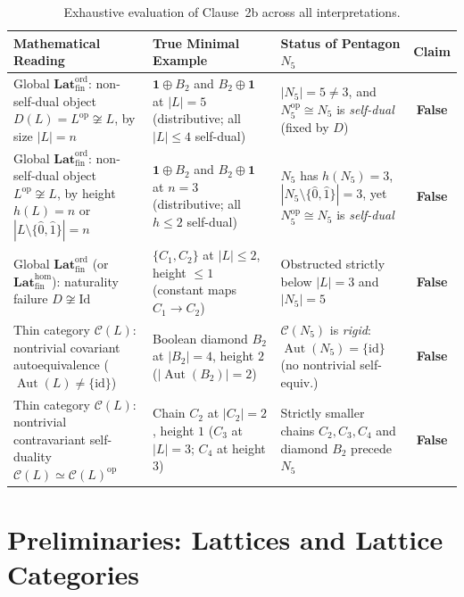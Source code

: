 \documentclass[11pt]{article}
\theoremstyle{definition}
\newcommand{\CatC}{\mathcal{C}}
\newcommand{\FinLatOrd}{\mathbf{Lat}_{\mathrm{fin}}^{\mathrm{ord}}}
\newcommand{\FinLatHom}{\mathbf{Lat}_{\mathrm{fin}}^{\mathrm{hom}}}
\newcommand{\Id}{\mathrm{Id}}
\newcommand{\op}{\mathrm{op}}
\newcommand{\Aut}{\operatorname{Aut}}
\begin{document}
\begin{table}[ht]
\centering
\small
\renewcommand{\arraystretch}{1.22}
\begin{tabular}{@{}>{\raggedright\arraybackslash}p{4.3cm}>{\raggedright\arraybackslash}p{4.4cm}>{\raggedright\arraybackslash}p{4.1cm}c@{}}
\toprule
\textbf{Mathematical Reading} & \textbf{True Minimal Example} & \textbf{Status of Pentagon $N_5$} & \textbf{Claim} \\
\midrule
Global $\FinLatOrd$: non-self-dual object $D(L) = L^{\op} \not\cong L$, by size $|L| = n$ &
$\mathbf{1} \oplus B_2$ and $B_2 \oplus \mathbf{1}$ at $|L| = 5$ (distributive; all $|L| \le 4$ self-dual) &
$|N_5| = 5 \ne 3$, and $N_5^{\op} \cong N_5$ is \emph{self-dual} (fixed by $D$) &
\textbf{False} \\
Global $\FinLatOrd$: non-self-dual object $L^{\op} \not\cong L$, by height $h(L) = n$ or $|L \setminus \{\hat{0},\hat{1}\}| = n$ &
$\mathbf{1} \oplus B_2$ and $B_2 \oplus \mathbf{1}$ at $n = 3$ (distributive; all $h \le 2$ self-dual) &
$N_5$ has $h(N_5) = 3$, $|N_5 \setminus \{\hat{0},\hat{1}\}| = 3$, yet $N_5^{\op} \cong N_5$ is \emph{self-dual} &
\textbf{False} \\
Global $\FinLatOrd$ (or $\FinLatHom$): naturality failure $D \not\cong \Id$ &
$\{C_1, C_2\}$ at $|L| \le 2$, height $\le 1$ (constant maps $C_1 \to C_2$) &
Obstructed strictly below $|L| = 3$ and $|N_5| = 5$ &
\textbf{False} \\
Thin category $\CatC(L)$: nontrivial covariant autoequivalence ($\Aut(L) \ne \{\mathrm{id}\}$) &
Boolean diamond $B_2$ at $|B_2| = 4$, height $2$ ($|\Aut(B_2)| = 2$) &
$\CatC(N_5)$ is \emph{rigid}: $\Aut(N_5) = \{\mathrm{id}\}$ (no nontrivial self-equiv.) &
\textbf{False} \\
Thin category $\CatC(L)$: nontrivial contravariant self-duality $\CatC(L) \simeq \CatC(L)^{\op}$ &
Chain $C_2$ at $|C_2| = 2$, height $1$ ($C_3$ at $|L| = 3$; $C_4$ at height $3$) &
Strictly smaller chains $C_2, C_3, C_4$ and diamond $B_2$ precede $N_5$ &
\textbf{False} \\
\bottomrule
\end{tabular}
\caption{Exhaustive evaluation of Clause~2b across all interpretations.}
\label{tab:summary}
\end{table}

\section{Preliminaries: Lattices and Lattice Categories}
\end{document}
